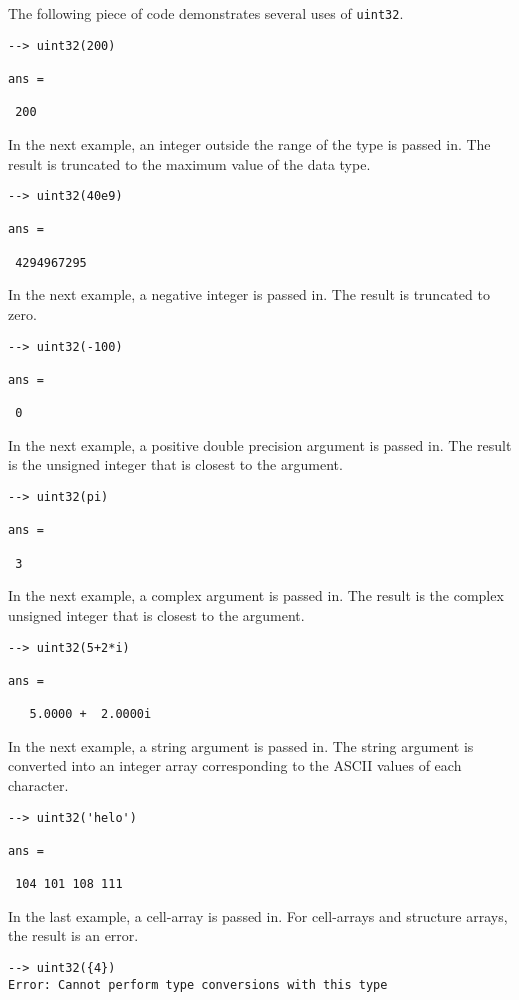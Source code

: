 The following piece of code demonstrates several uses of \verb|uint32|.
\begin{verbatim}
--> uint32(200)

ans = 

 200 
\end{verbatim}
In the next example, an integer outside the range of the type is passed in.  
The result is truncated to the maximum value of the data type.
\begin{verbatim}
--> uint32(40e9)

ans = 

 4294967295 
\end{verbatim}
In the next example, a negative integer is passed in.  The result is 
truncated to zero.
\begin{verbatim}
--> uint32(-100)

ans = 

 0 
\end{verbatim}
In the next example, a positive double precision argument is passed in.  
The result is the unsigned integer that is closest to the argument.
\begin{verbatim}
--> uint32(pi)

ans = 

 3 
\end{verbatim}
In the next example, a complex argument is passed in.  The result is the 
complex unsigned integer that is closest to the argument.
\begin{verbatim}
--> uint32(5+2*i)

ans = 

   5.0000 +  2.0000i 
\end{verbatim}
In the next example, a string argument is passed in.  The string argument 
is converted into an integer array corresponding to the ASCII values of each character.
\begin{verbatim}
--> uint32('helo')

ans = 

 104 101 108 111 
\end{verbatim}
In the last example, a cell-array is passed in.  For cell-arrays and 
structure arrays, the result is an error.
\begin{verbatim}
--> uint32({4})
Error: Cannot perform type conversions with this type
\end{verbatim}
